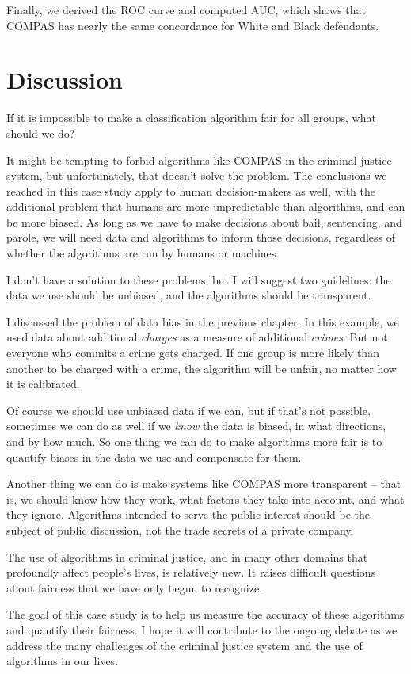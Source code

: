 Finally, we derived the ROC curve and computed AUC, which shows that
COMPAS has nearly the same concordance for White and Black defendants.

\section{Discussion}\label{discussion}

If it is impossible to make a classification algorithm fair for all
groups, what should we do?

It might be tempting to forbid algorithms like COMPAS in the criminal
justice system, but unfortunately, that doesn't solve the problem. The
conclusions we reached in this case study apply to human decision-makers
as well, with the additional problem that humans are more unpredictable
than algorithms, and can be more biased. As long as we have to make
decisions about bail, sentencing, and parole, we will need data and
algorithms to inform those decisions, regardless of whether the
algorithms are run by humans or machines.

I don't have a solution to these problems, but I will suggest two
guidelines: the data we use should be unbiased, and the algorithms
should be transparent.

I discussed the problem of data bias in the previous chapter. In this
example, we used data about additional \emph{charges} as a measure of
additional \emph{crimes}. But not everyone who commits a crime gets
charged. If one group is more likely than another to be charged with a
crime, the algorithm will be unfair, no matter how it is calibrated.

Of course we should use unbiased data if we can, but if that's not
possible, sometimes we can do as well if we \emph{know} the data is
biased, in what directions, and by how much. So one thing we can do to
make algorithms more fair is to quantify biases in the data we use and
compensate for them.

Another thing we can do is make systems like COMPAS more transparent --
that is, we should know how they work, what factors they take into
account, and what they ignore. Algorithms intended to serve the public
interest should be the subject of public discussion, not the trade
secrets of a private company.

The use of algorithms in criminal justice, and in many other domains
that profoundly affect people's lives, is relatively new. It raises
difficult questions about fairness that we have only begun to recognize.

The goal of this case study is to help us measure the accuracy of these
algorithms and quantify their fairness. I hope it will contribute to the
ongoing debate as we address the many challenges of the criminal justice
system and the use of algorithms in our lives.
